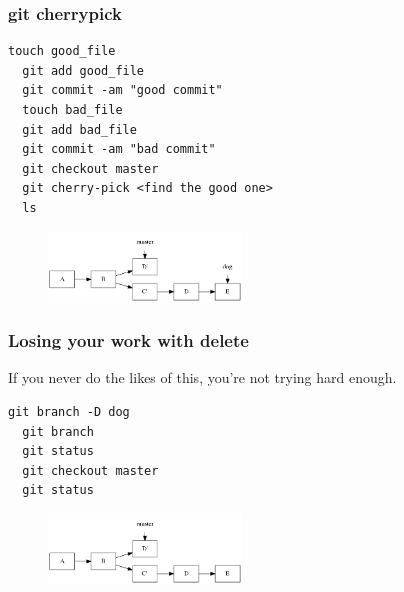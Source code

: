 \documentclass{beamer}
\begin{document}
\begin{frame}[fragile]
\frametitle{git cherrypick}
  
\vspace{1em}

\begin{lstlisting}[frame=single]
  touch good_file
  git add good_file
  git commit -am "good commit"
  touch bad_file
  git add bad_file
  git commit -am "bad commit"
  git checkout master
  git cherry-pick <find the good one>
  ls
\end{lstlisting}

\begin{figure}[p]
  \centering
  \includegraphics[height=5em]{cherry.png}
\end{figure}

\end{frame}

\begin{frame}[fragile]
\frametitle{Losing your work with delete}

If you never do the likes of this, you're not trying hard enough.

\vspace{1em}

\begin{lstlisting}[frame=single]
  git branch -D dog
  git branch
  git status
  git checkout master
  git status
\end{lstlisting}

\vspace{1em}

\begin{figure}[p]
  \centering
  \includegraphics[height=5em]{gone.png}
\end{figure}

\end{frame}
\end{document}
